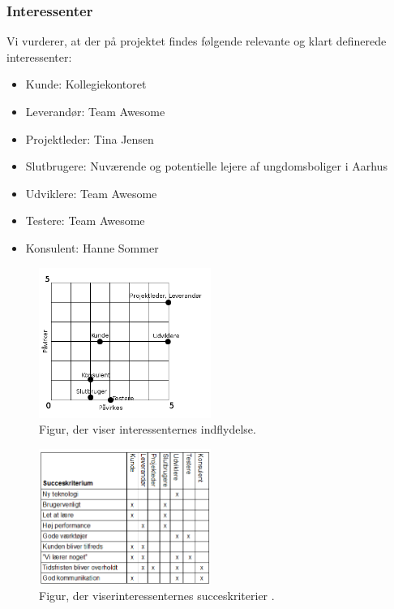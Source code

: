 \documentclass[12pt, a4paper]{report}
\begin{document}
\subsubsection{Interessenter}
Vi vurderer, at der på projektet findes følgende relevante og klart definerede interessenter:
\begin{itemize}
\item Kunde: Kollegiekontoret
\item Leverandør: Team Awesome
\item Projektleder: Tina Jensen
\item Slutbrugere: Nuværende og potentielle lejere af ungdomsboliger i Aarhus
\item Udviklere: Team Awesome
\item Testere: Team Awesome
\item Konsulent: Hanne Sommer
\end{itemize}

\begin{figure}[ht!]
\includegraphics[width=0.5\textwidth]{interessenter}
\caption{Figur, der viser interessenternes indflydelse.}
\end{figure}

\begin{figure}[ht!]
  \includegraphics[width=0.5\textwidth]{succeskriterium}
  \caption{Figur, der viserinteressenternes succeskriterier .}
\end{figure}
\end{document}
